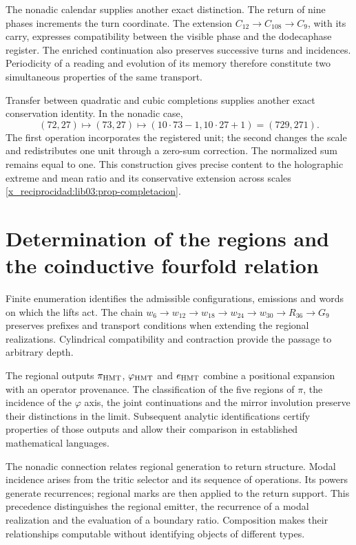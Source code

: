 The nonadic calendar supplies another exact distinction. The return of nine phases increments the turn coordinate. The extension \(C_{12}\to C_{108}\to C_9\), with its carry, expresses compatibility between the visible phase and the dodecaphase register. The enriched continuation also preserves successive turns and incidences. Periodicity of a reading and evolution of its memory therefore constitute two simultaneous properties of the same transport.

Transfer between quadratic and cubic completions supplies another exact conservation identity. In the nonadic case,
\[
 (72,27)\longmapsto(73,27)
 \longmapsto(10\cdot73-1,10\cdot27+1)=(729,271).
\]
The first operation incorporates the registered unit; the second changes the scale and redistributes one unit through a zero-sum correction. The normalized sum remains equal to one. This construction gives precise content to the holographic extreme and mean ratio and its conservative extension across scales \ref{x_reciprocidad:lib03:prop-completacion}.

\section{Determination of the regions and the coinductive fourfold relation}

Finite enumeration identifies the admissible configurations, emissions and words on which the lifts act. The chain \(w_6\to w_{12}\to w_{18}\to w_{24}\to w_{30}\to R_{36}\to G_9\) preserves prefixes and transport conditions when extending the regional realizations. Cylindrical compatibility and contraction provide the passage to arbitrary depth.

The regional outputs \(\pi_{\rm HMT}\), \(\varphi_{\rm HMT}\) and \(e_{\rm HMT}\) combine a positional expansion with an operator provenance. The classification of the five regions of \(\pi\), the incidence of the \(\varphi\) axis, the joint continuations and the mirror involution preserve their distinctions in the limit. Subsequent analytic identifications certify properties of those outputs and allow their comparison in established mathematical languages.

The nonadic connection relates regional generation to return structure. Modal incidence arises from the tritic selector and its sequence of operations. Its powers generate recurrences; regional marks are then applied to the return support. This precedence distinguishes the regional emitter, the recurrence of a modal realization and the evaluation of a boundary ratio. Composition makes their relationships computable without identifying objects of different types.

